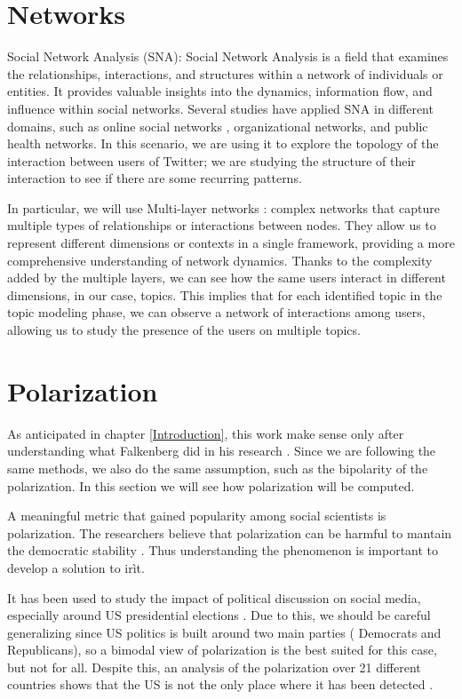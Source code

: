 \section[Networks]{Networks}
Social Network Analysis (SNA): Social Network Analysis is a field that examines the relationships, interactions, and structures within a network of individuals or entities. It provides valuable insights into the dynamics, information flow, and influence within social networks. Several studies have applied SNA in different domains, such as online social networks \cite{borgatti_network_2009}, organizational networks, and public health networks. In this scenario, we are using it to explore the topology of the interaction between users of Twitter; we are studying the structure of their interaction to see if there are some recurring patterns.

In particular, we will use Multi-layer networks \cite{kivela_multilayer_2014}:  complex networks that capture multiple types of relationships or interactions between nodes. They allow us to represent different dimensions or contexts in a single framework, providing a more comprehensive understanding of network dynamics. Thanks to the complexity added by the multiple layers, we can see how the same users interact in different dimensions, in our case, topics. This implies that for each identified topic in the topic modeling phase, we can observe a network of interactions among users, allowing us to study the presence of the users on multiple topics.




\section[Polarization]{Polarization}
As anticipated in chapter \ref{Introduction}, this work make sense only after understanding what Falkenberg did in his research \cite{falkenberg_growing_2022}. Since we are following the same methods, we also do the same assumption, such as the bipolarity of the polarization. In this section we will see how polarization will be computed.

A meaningful metric that gained popularity among social scientists is polarization. The researchers believe that polarization can be harmful to mantain the democratic stability \cite{mccoy_polarization_democracy_2018}. Thus understanding the phenomenon is important to develop a solution to irìt.

It has been used to study the impact of political discussion on social media, especially around US presidential elections \cite{conover_political_2011}
\cite{flamino_shifting_2021} . Due to this, we should be careful generalizing since US politics is built around two main parties ( Democrats and Republicans), so a bimodal view of polarization is the best suited for this case, but not for all. Despite this, an analysis of the polarization over 21 different countries shows that the US is not the only place where it has been detected  \cite{gidron_toward_2019}.



